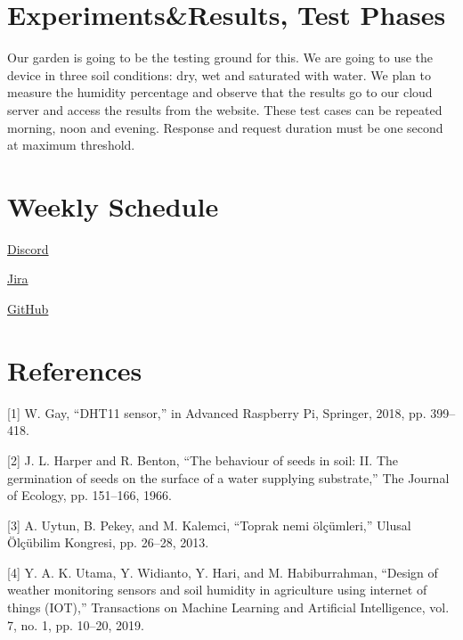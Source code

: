 \documentclass[14pt]{article}
\begin{document}
\section{Experiments\&Results, Test Phases}
Our garden is going to be the testing ground for this. We are going to use the device in three soil conditions: dry, wet and saturated with water. We plan to measure the humidity percentage and observe that the results go to our cloud server and access the results from the website. These test cases can be repeated morning, noon and evening. Response and request duration must be one second at maximum threshold. 
\section{Weekly Schedule}

\href{https://discord.gg/yA3v3fwm}{Discord} 
    
\href{https://eye-tracking-iyte.atlassian.net/jira/software/projects/SHM/boards/2}{Jira} 
    
\href{https://github.com/orgs/SoilHumidityMeter/dashboard}{GitHub} 





\section{References}

[1]
W. Gay, “DHT11 sensor,” in Advanced Raspberry Pi, Springer, 2018, pp. 399–418.

[2]
J. L. Harper and R. Benton, “The behaviour of seeds in soil: II. The germination of seeds on the surface of a water supplying substrate,” The Journal of Ecology, pp. 151–166, 1966.


[3]
A. Uytun, B. Pekey, and M. Kalemci, “Toprak nemi ölçümleri,” Ulusal Ölçübilim Kongresi, pp. 26–28, 2013.


[4]
Y. A. K. Utama, Y. Widianto, Y. Hari, and M. Habiburrahman, “Design of weather monitoring sensors and soil humidity in agriculture using internet of things (IOT),” Transactions on Machine Learning and Artificial Intelligence, vol. 7, no. 1, pp. 10–20, 2019.
\end{document}
